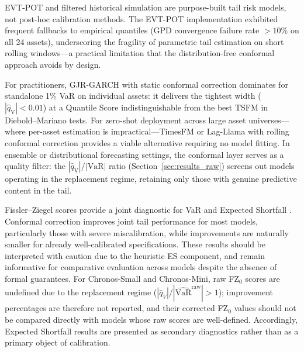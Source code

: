 \documentclass[preprint,11pt,authoryear]{elsarticle}
\newcommand{\VaR}{\mathrm{VaR}}
\newcommand{\1}{\boldsymbol{1}}
\newcommand{\qV}{\hat{q}_{\scriptscriptstyle\mathrm{V}}}
\begin{document}
	EVT-POT and filtered historical simulation are purpose-built tail risk models, not post-hoc calibration methods. The EVT-POT implementation exhibited frequent fallbacks to empirical quantiles (GPD convergence failure rate ${>}10\%$ on all 24 assets), underscoring the fragility of parametric tail estimation on short rolling windows---a practical limitation that the distribution-free conformal approach avoids by design.

	For practitioners, GJR-GARCH with static conformal correction
	dominates for standalone 1\% VaR on individual assets: it
	delivers the tightest width ($|\qV| < 0.01$) at a Quantile
	Score indistinguishable from the best TSFM in Diebold--Mariano
	tests. For zero-shot deployment across large asset
	universes---where per-asset estimation is impractical---TimesFM
	or Lag-Llama with rolling conformal correction provides a viable
	alternative requiring no model fitting. In ensemble or
	distributional forecasting settings, the conformal layer serves
	as a quality filter: the $|\qV|/|\VaR|$ ratio
	(Section~\ref{sec:results_raw}) screens out models operating in
	the replacement regime, retaining only those with genuine
	predictive content in the tail.

	Fissler--Ziegel scores provide a joint diagnostic for VaR and Expected Shortfall \citep{fissler2016higher}. Conformal correction improves joint tail performance for most models, particularly those with severe miscalibration, while improvements are naturally smaller for already well-calibrated specifications. These results should be interpreted with caution due to the heuristic ES component, and remain informative for comparative evaluation across models despite the absence of formal guarantees.
	For Chronos-Small and Chronos-Mini, raw FZ$_0$ scores are undefined due to the replacement regime ($|\hat{q}_V|/|\widehat{\VaR}^{\mathrm{raw}}| > 1$); improvement percentages are therefore not reported, and their corrected FZ$_0$ values should not be compared directly with models whose raw scores are well-defined.
	Accordingly, Expected Shortfall results are presented as secondary diagnostics rather than as a primary object of calibration.
\end{document}
